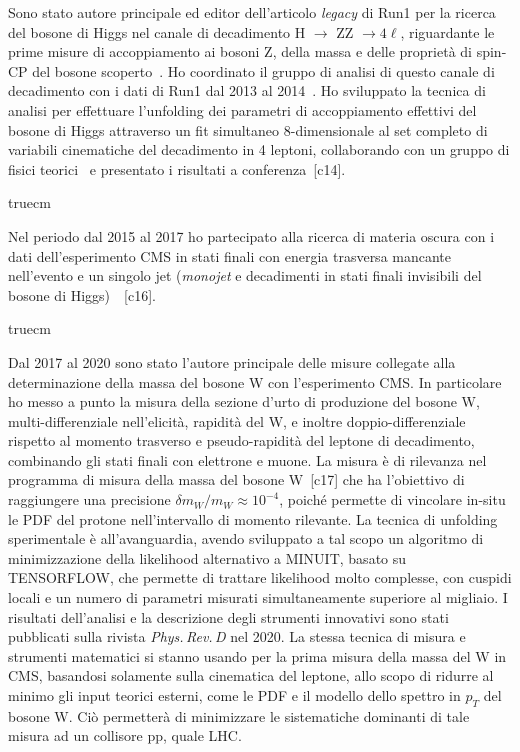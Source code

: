 \documentclass[11pt,twoside,a4paper]{article}
\begin{document}
Sono stato autore principale ed editor dell'articolo \textit{legacy}
di Run1 per la ricerca del bosone di Higgs nel canale di decadimento H
$\to$ ZZ $\to 4\ell$, riguardante le prime misure di accoppiamento ai
bosoni Z, della massa e delle propriet\`a di spin-CP del bosone
scoperto~\cite{Chatrchyan:2013mxa}. Ho coordinato il gruppo di analisi
di questo canale di decadimento con i dati di Run1 dal 2013 al
2014~\cite{Khachatryan:2014kca}. Ho sviluppato la tecnica di analisi
per effettuare l'unfolding dei parametri di accoppiamento effettivi
del bosone di Higgs attraverso un fit simultaneo 8-dimensionale al set
completo di variabili cinematiche del decadimento in 4 leptoni,
collaborando con un gruppo di fisici teorici~\cite{Chen:2014pia} e
presentato i risultati a conferenza~[c14].

 truecm

Nel periodo dal 2015 al 2017 ho partecipato alla ricerca di materia
oscura con i dati dell'esperimento CMS in stati finali con energia
trasversa mancante nell'evento e un singolo jet (\textit{monojet} e
decadimenti in stati finali invisibili del bosone di
Higgs)~\cite{Sirunyan:2017hci,Sirunyan:2017jix}~[c16].

 truecm

Dal 2017 al 2020 sono stato l'autore principale delle misure collegate
alla determinazione della massa del bosone W con l'esperimento CMS. In
particolare ho messo a punto la misura della sezione d'urto di
produzione del bosone W, multi-differenziale nell'elicit\`a,
rapidit\`a del W, e inoltre doppio-differenziale rispetto al momento
trasverso e pseudo-rapidit\`a del leptone di decadimento, combinando
gli stati finali con elettrone e muone. La misura \`e di rilevanza nel
programma di misura della massa del bosone W~[c17] che ha l'obiettivo
di raggiungere una precisione $\delta m_W/m_W\approx 10^{-4}$,
poich\'e permette di vincolare in-situ le PDF del protone
nell'intervallo di momento rilevante. La tecnica di unfolding
sperimentale \`e all'avanguardia, avendo sviluppato a tal scopo un
algoritmo di minimizzazione della likelihood alternativo a
\textsc{MINUIT}, basato su \textsc{TENSORFLOW}, che permette di
trattare likelihood molto complesse, con cuspidi locali e un numero di
parametri misurati simultaneamente superiore al migliaio. I risultati
dell'analisi e la descrizione degli strumenti innovativi sono stati
pubblicati sulla rivista \textit{Phys.\,Rev.\,D} nel 2020. La stessa
tecnica di misura e strumenti matematici si stanno usando per la prima
misura della massa del W in CMS, basandosi solamente sulla cinematica
del leptone, allo scopo di ridurre al minimo gli input teorici
esterni, come le PDF e il modello dello spettro in $p_T$ del bosone W.
Ci\`o permetter\`a di minimizzare le sistematiche dominanti di tale
misura ad un collisore pp, quale LHC.
\end{document}
